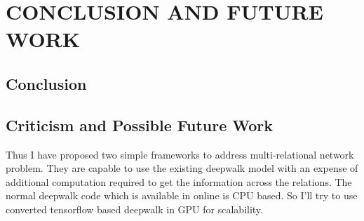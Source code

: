 \chapter{CONCLUSION AND FUTURE WORK}
\label{chap:concl}

\section{Conclusion}
 
\section{Criticism and Possible Future Work}
Thus I have proposed two simple frameworks to address multi-relational network problem. They are capable to use the existing deepwalk model \cite{deepwalk} with an expense of additional computation required to get the information across the relations. The normal deepwalk code which is available in online is CPU based. So I'll try to use converted tensorflow based deepwalk in GPU for scalability.

